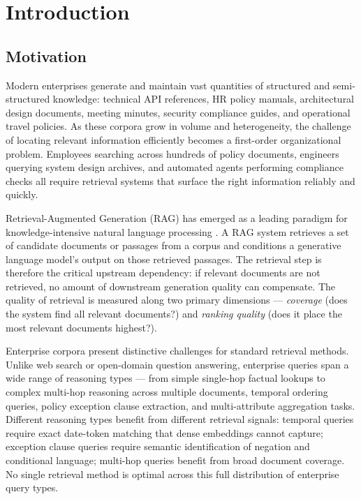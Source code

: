 \chapter{Introduction}
\label{chap:introduction}

\section{Motivation}
\label{sec:intro_motivation}

Modern enterprises generate and maintain vast quantities of structured and semi-structured knowledge: technical API references, HR policy manuals, architectural design documents, meeting minutes, security compliance guides, and operational travel policies. As these corpora grow in volume and heterogeneity, the challenge of locating relevant information efficiently becomes a first-order organizational problem. Employees searching across hundreds of policy documents, engineers querying system design archives, and automated agents performing compliance checks all require retrieval systems that surface the right information reliably and quickly.

Retrieval-Augmented Generation (RAG) has emerged as a leading paradigm for knowledge-intensive natural language processing \citep{lewis2020rag}. A RAG system retrieves a set of candidate documents or passages from a corpus and conditions a generative language model's output on those retrieved passages. The retrieval step is therefore the critical upstream dependency: if relevant documents are not retrieved, no amount of downstream generation quality can compensate. The quality of retrieval is measured along two primary dimensions --- \emph{coverage} (does the system find all relevant documents?) and \emph{ranking quality} (does it place the most relevant documents highest?).

Enterprise corpora present distinctive challenges for standard retrieval methods. Unlike web search or open-domain question answering, enterprise queries span a wide range of reasoning types --- from simple single-hop factual lookups to complex multi-hop reasoning across multiple documents, temporal ordering queries, policy exception clause extraction, and multi-attribute aggregation tasks. Different reasoning types benefit from different retrieval signals: temporal queries require exact date-token matching that dense embeddings cannot capture; exception clause queries require semantic identification of negation and conditional language; multi-hop queries benefit from broad document coverage. No single retrieval method is optimal across this full distribution of enterprise query types.

